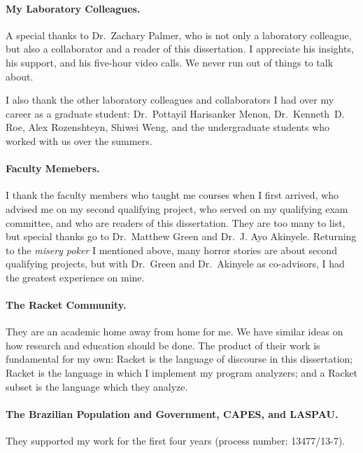 \documentclass[12pt, oneside]{book}
\begin{document}
\paragraph{My Laboratory Colleagues.}

A special thanks to Dr.~Zachary Palmer, who is not only a laboratory colleague, but also a collaborator and a reader of this dissertation. I appreciate his insights, his support, and his five-hour video calls. We never run out of things to talk about.

I also thank the other laboratory colleagues and collaborators I had over my career as a graduate student: Dr.~Pottayil Harisanker Menon, Dr.~Kenneth~D. Roe, Alex Rozenshteyn, Shiwei Weng, and the undergraduate students who worked with us over the summers.

\paragraph{Faculty Memebers.}

I thank the faculty members who taught me courses when I first arrived, who advised me on my second qualifying project, who served on my qualifying exam committee, and who are readers of this dissertation. They are too many to list, but special thanks go to Dr.~Matthew Green and Dr.~J. Ayo Akinyele. Returning to the \emph{misery poker} I mentioned above, many horror stories are about second qualifying projects, but with Dr.~Green and Dr.~Akinyele as co-advisors, I had the greatest experience on mine.

\paragraph{The Racket Community.}

They are an academic home away from home for me. We have similar ideas on how research and education should be done. The product of their work is fundamental for my own: Racket is the language of discourse in this dissertation; Racket is the language in which I implement my program analyzers; and a Racket subset is the language which they analyze.

\paragraph{The Brazilian Population and Government, CAPES, and LASPAU.}

They supported my work for the first four years (process number: 13477/13-7).
\end{document}
